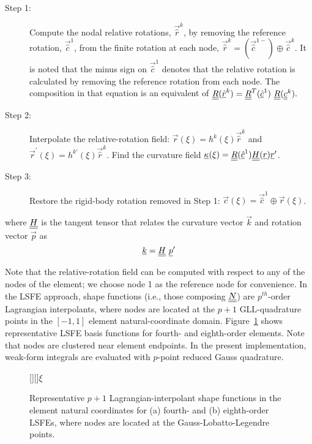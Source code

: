 \begin{description}

    \item[Step 1:] Compute the nodal relative rotations, $\vec{\hat{r}}^k$,
by removing the reference rotation, $\vec{\hat{c}}^1$, from the finite
rotation at each node, $\vec{\hat{r}}^k = (\vec{\hat{c}}^{1-}) \oplus
\vec{\hat{c}}^k$. It is noted that the minus sign on $\vec{\hat{c}}^1$ denotes that the relative rotation is calculated by removing the reference rotation from each node.  The composition in that equation is an equivalent of $\underline{\underline{R}}(\underline{\hat{r}}^k) = \underline{\underline{R}}^T(\underline{\hat{c}}^1)~\underline{\underline{R}}(\underline{\underline{c}}^k).$

    \item[Step 2:] Interpolate the relative-rotation field: $\vec{r}(\xi) = h^k(\xi) \vec{\hat{r}}^k$ and $\vec{r}^\prime(\xi) = h^{k \prime}(\xi) \vec{\hat{r}}^k$. Find the curvature field $\underline{\kappa}(\xi) = \underline{\underline{R}}(\underline{\hat{c}}^1) \underline{\underline{H}}(\underline{r}) \underline{r}^\prime$.

    \item[Step 3:] Restore the rigid-body rotation removed in Step 1: $\vec{c}(\xi) = \vec{\hat{c}}^1 \oplus \vec{r}(\xi)$.
\end{description} 
where $\underline{\underline{H}}$ is the tangent tensor that relates the curvature vector $\vec{k}$ and rotation vector $\vec{p}$ as
\begin{equation}
    \label{Tensor}
    \underline{k} = \underline{\underline{H}}~ \underline{p}^\prime
\end{equation}

Note that the relative-rotation field can be computed with respect to any of
the nodes of the element; we choose node 1 as the reference node for
convenience. In the LSFE approach, shape functions (i.e., those composing $\underline{\underline{N}}$) are
$p^{th}$-order Lagrangian interpolants, where nodes are located at the $p+1$
GLL-quadrature points in the $[-1,1]$ element natural-coordinate domain.
Figure~\ref{fig:N4_lsfe} shows representative LSFE basis functions for  
fourth- and eighth-order elements.  Note that nodes are clustered near
element endpoints.
In the present implementation, weak-form integrals are evaluated with
$p$-point reduced Gauss quadrature.

\begin{figure}
    \centering
    [][]{$\xi$}
    \caption{Representative $p+1$ Lagrangian-interpolant shape functions in
the element natural coordinates for
(a) fourth- and (b) eighth-order LSFEs, where nodes are located at the
Gauss-Lobatto-Legendre points.}
    \label{fig:N4_lsfe}
\end{figure}

